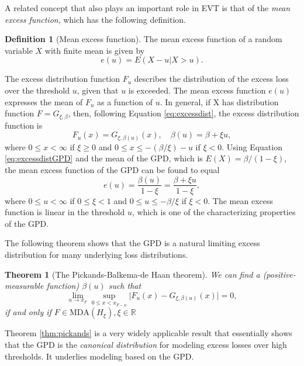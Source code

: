 \documentclass[a4paper,11pt]{article}
\newtheorem{theorem}{Theorem}[section]
\theoremstyle{definition}
\newtheorem{definition}{Definition}[section]
\theoremstyle{definition}
\theoremstyle{definition}
\theoremstyle{definition}
\theoremstyle{remark}
\begin{document}
A related concept that also plays an important role in EVT is that of the \emph{mean excess function}, which has the following definition.
\begin{definition}[Mean excess function]
\protect\hypertarget{def:meanexcess}{}{\label{def:meanexcess} {} }
The mean excess function of a random variable \(X\) with finite mean is given by
\begin{equation}
e(u) = E(X - u \vert X > u).
\label{eq:meanexcess}
\end{equation}
\end{definition}
The excess distribution function \(F_u\) describes the distribution of the excess loss over the threshold \(u\), given that \(u\) is exceeded. The mean excess function \(e(u)\) expresses the mean of \(F_u\) as a function of \(u\). In general, if X has distribution function \(F = G_{\xi, \beta}\), then, following Equation \eqref{eq:excessdist}, the excess distribution function is
\begin{equation}
F_{u}(x) = G_{\xi, \beta (u)}(x), \quad \beta (u) = \beta + \xi u,
\label{eq:excessdistGPD}
\end{equation}
where \(0 \leq x < \infty\) if \(\xi \geq 0\) and \(0 \leq x \leq -(\beta / \xi) - u\) if \(\xi < 0\). Using Equation \eqref{eq:excessdistGPD} and the mean of the GPD, which is \(E(X) = \beta / (1-\xi)\), the mean excess function of the GPD can be found to equal
\begin{equation}
e(u) = \frac{\beta (u)}{1 - \xi} = \frac{\beta + \xi u}{1 - \xi},
\label{eq:meanexcessGPD}
\end{equation}
where \(0 \leq u < \infty\) if \(0 \leq \xi < 1\) and \(0 \leq u \leq -\beta / \xi\) if \(\xi < 0\). The mean excess function is linear in the threshold \(u\), which is one of the characterizing properties of the GPD.

The following theorem shows that the GPD is a natural limiting excess distribution for many underlying loss distributions.
\begin{theorem}[The Pickands-Balkema-de Haan theorem]
\protect\hypertarget{thm:pickands}{}{\label{thm:pickands} {} }
We can find a (positive-measurable function) \(\beta (u)\) such that
\begin{equation}
\lim_{u \to x_F} \sup_{0 \leq x < x_{F-u}} \vert F_{u}(x) - G_{\xi, \beta (u)} (x) \vert = 0,
\label{eq:pickands}
\end{equation}
if and only if \(F \in \text{MDA} (H_{\xi}), \xi \in \mathbb R\)
\end{theorem}
Theorem \ref{thm:pickands} is a very widely applicable result that essentially shows that the GPD is the \emph{canonical distribution} for modeling excess losses over high thresholds. It underlies modeling based on the GPD.
\end{document}
